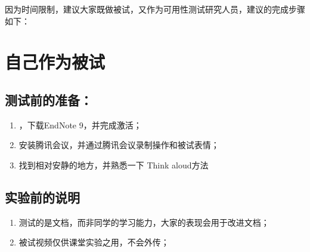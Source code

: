 \documentclass[letterpaper,10pt,english]{sphinxmanual}
\begin{document}
\sphinxAtStartPar
因为时间限制，建议大家既做被试，又作为可用性测试研究人员，建议的完成步骤如下：


\section{自己作为被试}
\label{\detokenize{capstone-project/endnote-doc-usability:id2}}

\subsection{测试前的准备：}
\label{\detokenize{capstone-project/endnote-doc-usability:id3}}\begin{enumerate}
%
\item {} 
\sphinxAtStartPar
{} ，下载EndNote 9，并完成激活；

\item {} 
\sphinxAtStartPar
安装腾讯会议，并通过腾讯会议录制操作和被试表情；

\item {} 
\sphinxAtStartPar
找到相对安静的地方，并熟悉一下 Think aloud方法

\end{enumerate}


\subsection{实验前的说明}
\label{\detokenize{capstone-project/endnote-doc-usability:id4}}\begin{enumerate}
%
\item {} 
\sphinxAtStartPar
测试的是文档，而非同学的学习能力，大家的表现会用于改进文档；

\item {} 
\sphinxAtStartPar
被试视频仅供课堂实验之用，不会外传；

\end{enumerate}
\end{document}
